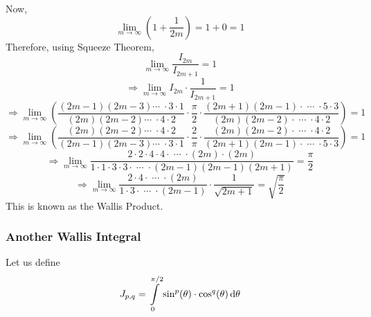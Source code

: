 \documentclass[14]{article}
\theoremstyle{definition}
\theoremstyle{case}
\begin{document}
Now, \[\lim\limits_{m \to \infty} \left( 1 + \dfrac1{2m} \right) = 1+0 = 1\]
Therefore, using Squeeze Theorem,
\[\lim\limits_{m \to \infty} \dfrac{I_{2m}}{I_{2m+1}} = 1\]
\[\Rightarrow \lim\limits_{m \to \infty} I_{2m} \cdot \dfrac{1}{I_{2m+1}} = 1 \]
\[\Rightarrow \lim\limits_{m \to \infty} \left(
\dfrac{ (2m-1)(2m-3) \cdots \; \cdot 3 \cdot 1 }{(2m)(2m-2) \cdots\; \cdot 4 \cdot 2} \cdot \dfrac{\pi}{2} \cdot
\dfrac{ (2m+1)(2m-1) \cdot \; \cdots \; \cdot 5 \cdot 3 }{ (2m)(2m-2)\cdot \; \cdots \; \cdot 4 \cdot 2 }\right) = 1
\]
\[\Rightarrow \lim\limits_{m \to \infty} \left(
\dfrac{(2m)(2m-2) \cdots\; \cdot 4 \cdot 2}{ (2m-1)(2m-3) \cdots \; \cdot 3 \cdot 1 } \cdot \dfrac2{\pi} \cdot
\dfrac{ (2m)(2m-2)\cdot \; \cdots \; \cdot 4 \cdot 2 }{ (2m+1)(2m-1) \cdot \; \cdots \; \cdot 5 \cdot 3 }\right) = 1
\]
\[\Rightarrow \lim\limits_{m \to \infty} \dfrac{2\cdot 2 \cdot 4 \cdot 4 \cdot \; \cdots \; \cdot (2m)\cdot (2m)}{1\cdot 1 \cdot 3 \cdot 3 \cdot\; \cdots \; \cdot (2m-1)(2m-1)(2m+1)} = \dfrac{\pi}{2}\]
\[\Rightarrow \lim\limits_{m \to \infty} \dfrac{2 \cdot 4  \cdot \; \cdots \; \cdot (2m)}{1 \cdot 3 \cdot\; \cdots \; \cdot (2m-1)} \cdot \dfrac1{\sqrt{2m+1}} = \sqrt{\dfrac{\pi}{2}}\]
This is known as the Wallis Product.
\pagebreak
\subsubsection{Another Wallis Integral}
Let us define
\[J_{p, q} = \int\limits_0^{\pi/2} \sin^p(\theta) \cdot \cos^q(\theta) \dif \theta\]
\end{document}
